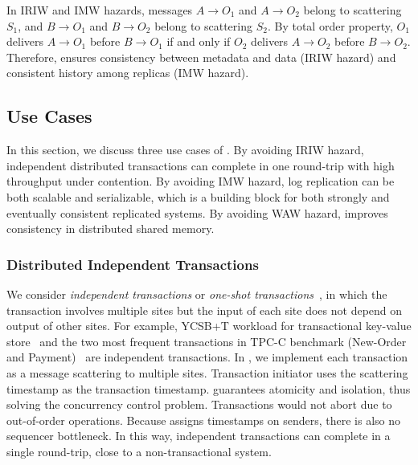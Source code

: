 In IRIW and IMW hazards, messages $A \rightarrow O_1$ and $A \rightarrow O_2$ belong to scattering $S_1$, and $B \rightarrow O_1$ and $B \rightarrow O_2$ belong to scattering $S_2$.
By total order property, $O_1$ delivers $A \rightarrow O_1$ before $B \rightarrow O_1$ if and only if $O_2$ delivers $A \rightarrow O_2$ before $B \rightarrow O_2$. Therefore, \sys ensures consistency between metadata and data (IRIW hazard) and consistent history among replicas (IMW hazard).


\subsection{Use Cases}
\label{subsec:application-scenarios}

In this section, we discuss three use cases of \sys.
By avoiding IRIW hazard, independent distributed transactions can complete in one round-trip with high throughput under contention.
By avoiding IMW hazard, log replication can be both scalable and serializable, which is a building block for both strongly and eventually consistent replicated systems.
By avoiding WAW hazard, \sys improves consistency in distributed shared memory.

\subsubsection{Distributed Independent Transactions}
\label{subsec:transactional-kvs}
We consider \emph{independent transactions} or \emph{one-shot transactions}~\cite{kallman2008h}, in which the transaction involves multiple sites but the input of each site does not depend on output of other sites.
For example, YCSB+T workload for transactional key-value store~\cite{dey2014ycsbt} and the two most frequent transactions in TPC-C benchmark (New-Order and Payment)~\cite{tpcc} are independent transactions.
In \sys, we implement each transaction as a message scattering to multiple sites.
Transaction initiator uses the scattering timestamp as the transaction timestamp.
\sys guarantees atomicity and isolation, thus solving the concurrency control problem.
Transactions would not abort due to out-of-order operations.
Because \sys assigns timestamps on senders, there is also no sequencer bottleneck.
In this way, independent transactions can complete in a single round-trip, close to a non-transactional system.%

